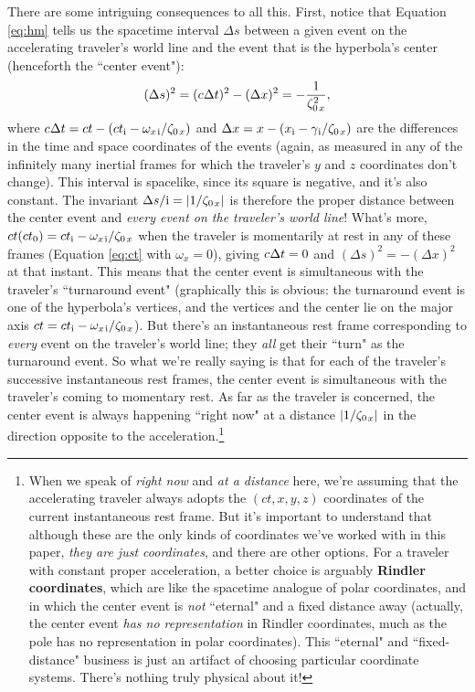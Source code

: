 \documentclass[12pt]{article}
\begin{document}
There are some intriguing consequences to all this. First, notice that Equation \ref{eq:hm} tells us the spacetime interval $\Delta s$ between a given event on the accelerating traveler's world line and the event that is the hyperbola's center (henceforth the ``center event"):
\begin{equation*}
(\Delta s)^2 = (c \mkern.5mu \Delta t)^2 - (\Delta x)^2 = - \dfrac{1}{ \zeta^2_{0 \mkern2mu x}},
\end{equation*}
where $c \mkern.5mu \Delta t = ct - (ct_{\mathrm{i}} - \omega_{x \mkern2mu \textrm{i} } / \zeta_{0 \mkern2mu x})$ and $\Delta x = x - (x_{\mathrm{i}} - \gamma_{\mkern1mu \mathrm{i}} / \zeta_{0 \mkern2mu x})$ are the differences in the time and space coordinates of the events (again, as measured in any of the infinitely many inertial frames for which the traveler's $y$ and $z$ coordinates don't change). This interval is spacelike, since its square is negative, and it's also constant. The invariant $\Delta s / \mathrm{i} = |1 / \zeta_{0 \mkern2mu x}|$ is therefore the proper distance between the center event and \emph{every event on the traveler's world line}! What's more, $ct(ct_0) = ct_{\mathrm{i}} - \omega_{x \mkern2mu \textrm{i} } / \zeta_{0 \mkern2mu x}$ when the traveler is momentarily at rest in any of these frames (Equation \ref{eq:ct} with $\omega_x = 0$), giving $c \mkern.5mu \Delta t = 0$ and $(\Delta s)^2 = - (\Delta x)^2$ at that instant. This means that the center event is simultaneous with the traveler's ``turnaround event" (graphically this is obvious: the turnaround event is one of the hyperbola's vertices, and the vertices and the center lie on the major axis $ct = ct_{\mathrm{i}} - \omega_{x \mkern2mu \textrm{i} } / \zeta_{0 \mkern2mu x}$). But there's an instantaneous rest frame corresponding to \emph{every} event on the traveler's world line; they \emph{all} get their ``turn" as the turnaround event. So what we're really saying is that for each of the traveler's successive instantaneous rest frames, the center event is simultaneous with the traveler's coming to momentary rest. As far as the traveler is concerned, the center event is always happening ``right now" at a distance $|1 / \zeta_{0 \mkern2mu x}|$ in the direction opposite to the acceleration.\footnote{When we speak of \emph{right now} and \emph{at a distance} here, we're assuming that the accelerating traveler always adopts the $(ct, x, y, z)$ coordinates of the current instantaneous rest frame. But it's important to understand that although these are the only kinds of coordinates we've worked with in this paper, \emph{they are just coordinates}, and there are other options. For a traveler with constant proper acceleration, a better choice is arguably \textbf{Rindler coordinates}, which are like the spacetime analogue of polar coordinates, and in which the center event is \emph{not} ``eternal" and a fixed distance away (actually, the center event \emph{has no representation} in Rindler coordinates, much as the pole has no representation in polar coordinates). This ``eternal" and ``fixed-distance" business is just an artifact of choosing particular coordinate systems. There's nothing truly physical about it!}
\end{document}
